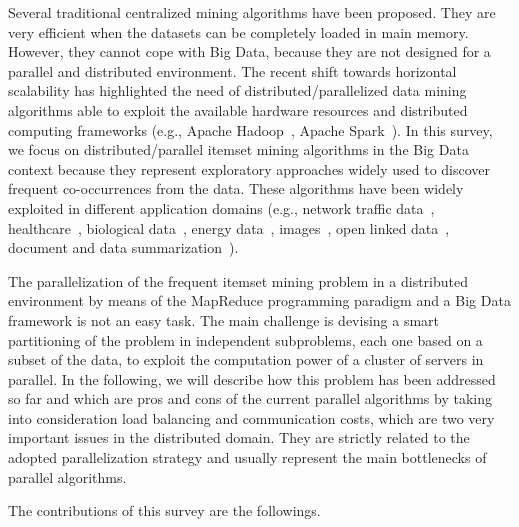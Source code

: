 \documentclass[preprint,review,12pt]{elsarticle}
\begin{document}
Several traditional centralized mining algorithms have been proposed. They are very efficient when the datasets can be completely loaded in 
main memory. However, they cannot cope with Big Data, because they are not designed for a parallel and distributed environment.  
The recent shift towards horizontal scalability has highlighted the need of
distributed/parallelized data mining algorithms able to exploit the available hardware resources and 
distributed computing frameworks (e.g., Apache Hadoop~\cite{HDFS}, Apache Spark~\cite{Zaharia_spark}).
In this survey, we focus on distributed/parallel itemset mining algorithms in the Big Data context because they
represent exploratory approaches widely used to discover frequent co-occurrences from the data. 
These algorithms have been widely exploited in different
application domains (e.g., network traffic data~\cite{ApilettiBCCG13},
healthcare~\cite{META-TIST-2015}, biological data~\cite{DBLP:conf/sigmod/CongXPTY04}, energy
data~\cite{NostroENDM2016_senzacrossref}, images~\cite{zaianeimage},  open
linked data~\cite{BCOpenLinkedData}, document and data summarization~\cite{BaralisCFG15,DBLP:journals/cg/LopesPPM07,Mampaey:2011:TMI:2020408.2020499}).

The parallelization of the frequent itemset mining problem in a distributed environment by means of the MapReduce programming paradigm and a Big Data framework
is not an easy task. The main challenge is devising a smart partitioning of the problem in independent subproblems, each one based on a subset of the data, to exploit the computation power of a cluster of servers in parallel. In the following, we will describe how this problem has been addressed so far and which are pros and cons of the current parallel algorithms by taking into consideration load balancing and communication costs, which are two very important issues in the distributed domain. 
They are strictly related to the adopted parallelization strategy and usually represent the main bottlenecks of parallel algorithms.

The contributions of this survey are the followings. 
\end{document}
